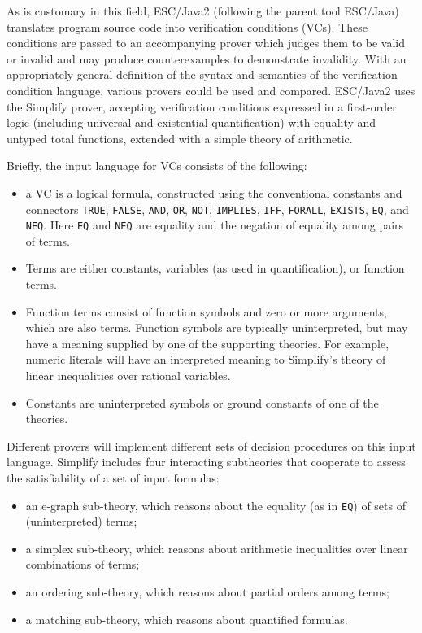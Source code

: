 \documentclass{sig-alternate}
\begin{document}
As is customary in this field, ESC/Java2 (following the parent tool ESC/Java) translates program source code
into verification conditions (VCs).  These conditions are passed to an accompanying prover which
judges them to be valid or invalid and may produce counterexamples to demonstrate
invalidity.  With an appropriately general definition of the syntax and semantics of the verification
condition language, various provers could be used and compared.  ESC/Java2 uses the
Simplify \cite{nelson80,simplify} prover, accepting verification conditions expressed in a
first-order logic (including universal and existential quantification) with equality and untyped total
functions, extended with a simple theory of arithmetic.

Briefly, the input language for VCs consists of the following:
\begin{itemize}
\item a VC is a logical formula, constructed using the conventional constants and connectors
\texttt{TRUE}, \texttt{FALSE}, \texttt{AND}, \texttt{OR}, \texttt{NOT}, \texttt{IMPLIES},
\texttt{IFF}, \texttt{FORALL}, \texttt{EXISTS}, \texttt{EQ}, and \texttt{NEQ}.  Here \texttt{EQ} and
\texttt{NEQ} are equality and the negation of equality among pairs of terms.
\item Terms are either constants, variables (as used in quantification), or function terms.
\item Function terms consist of function symbols and zero or more arguments, which are also
terms.  Function symbols are typically uninterpreted, but may have a meaning supplied by
one of the supporting theories.  For example, numeric literals will have an interpreted meaning
to Simplify's theory of linear inequalities over rational variables.
\item Constants are uninterpreted symbols or ground constants of one of the theories.
\end{itemize}

Different provers will implement different sets of decision procedures on this input language.
Simplify includes four interacting subtheories that cooperate to assess the satisfiability of a 
set of input formulas:
\begin{itemize}
\item an e-graph sub-theory, which reasons about the equality (as in \texttt{EQ}) of sets of
(uninterpreted) terms;
\item a simplex sub-theory, which reasons about arithmetic inequalities over linear combinations
of terms;
\item an ordering sub-theory, which reasons about partial orders among terms;
\item a matching sub-theory, which reasons about quantified formulas.
\end{itemize}
\end{document}
